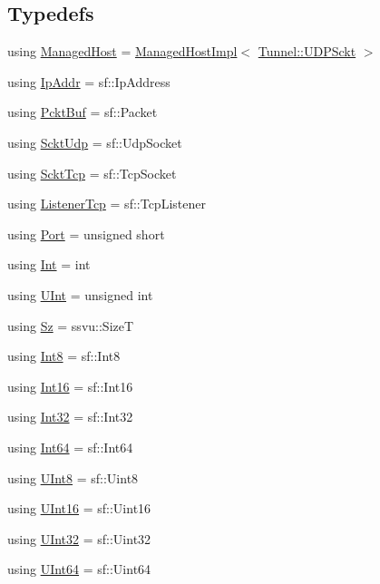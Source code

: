 \subsection*{Typedefs}
\begin{DoxyCompactItemize}
\item 
using \hyperlink{namespacenl_a1686086c19957ab23476f06ad144cd8b}{Managed\+Host} = \hyperlink{classnl_1_1ManagedHostImpl}{Managed\+Host\+Impl}$<$ \hyperlink{classnl_1_1Tunnel_1_1UDPSckt}{Tunnel\+::\+U\+D\+P\+Sckt} $>$
\item 
using \hyperlink{namespacenl_a62ea075e0e667b99f002ec1af2b5b348}{Ip\+Addr} = sf\+::\+Ip\+Address
\item 
using \hyperlink{namespacenl_a789b828a23e37a113433c2838e7c8e28}{Pckt\+Buf} = sf\+::\+Packet
\item 
using \hyperlink{namespacenl_a7f107e98f2c5ed8fe4d7e2c62af3d162}{Sckt\+Udp} = sf\+::\+Udp\+Socket
\item 
using \hyperlink{namespacenl_a2e729c5cf9a70e3b551ebc62148fd1db}{Sckt\+Tcp} = sf\+::\+Tcp\+Socket
\item 
using \hyperlink{namespacenl_a57c1656c78f6394db5de75960facff10}{Listener\+Tcp} = sf\+::\+Tcp\+Listener
\item 
using \hyperlink{namespacenl_a12899c87e239db66809da0a71fcc9129}{Port} = unsigned short
\item 
using \hyperlink{namespacenl_a75e874e6d5b06878d52c27dd3082624f}{Int} = int
\item 
using \hyperlink{namespacenl_ae6539dc8a47674966876b1d317fb7764}{U\+Int} = unsigned int
\item 
using \hyperlink{namespacenl_a023c3fe765917605f0c95794cf6ebd30}{Sz} = ssvu\+::\+Size\+T
\item 
using \hyperlink{namespacenl_aa6c066586cb28b7eef102ab229f1b37f}{Int8} = sf\+::\+Int8
\item 
using \hyperlink{namespacenl_a0da4be5ca70238b528bcaf2fb7d460c3}{Int16} = sf\+::\+Int16
\item 
using \hyperlink{namespacenl_a92286b51ec22e31b1e1d2dffa2f594c1}{Int32} = sf\+::\+Int32
\item 
using \hyperlink{namespacenl_af32eb9f8fa8a9a1f7079ca2c01c7ceb9}{Int64} = sf\+::\+Int64
\item 
using \hyperlink{namespacenl_ab569497fddc246f4980e636e1c513fa4}{U\+Int8} = sf\+::\+Uint8
\item 
using \hyperlink{namespacenl_a36ef85a20c5ddd4ac50c4ea617a7caf9}{U\+Int16} = sf\+::\+Uint16
\item 
using \hyperlink{namespacenl_a5a2105bdb0a0734402590ce0805d7e31}{U\+Int32} = sf\+::\+Uint32
\item 
using \hyperlink{namespacenl_ab7e89390015f4722f18ec1f4fe57a8a9}{U\+Int64} = sf\+::\+Uint64
\end{DoxyCompactItemize}
